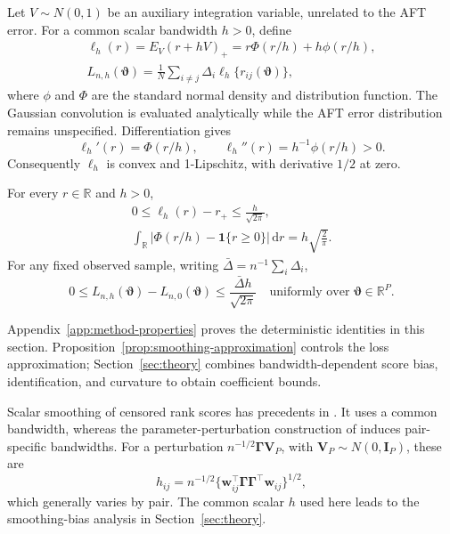 Let $V\sim N(0,1)$ be an auxiliary integration variable, unrelated to the AFT error. For a common scalar bandwidth $h>0$, define
\begin{equation}
 \begin{gathered}
\ell_h(r)=E_V(r+hV)_+
   =r\Phi(r/h)+h\phi(r/h),\\
 L_{n,h}(\bm{\vartheta})=\frac1N\sum_{i\ne j}\Delta_i\ell_h\{r_{ij}(\bm{\vartheta})\},
 \end{gathered}
 \label{eq:smoothed-gehan}
\end{equation}
where $\phi$ and $\Phi$ are the standard normal density and distribution function. The Gaussian convolution is evaluated analytically while the AFT error distribution remains unspecified. Differentiation gives
\begin{equation}
 \ell_h'(r)=\Phi(r/h),\qquad
 \ell_h''(r)=h^{-1}\phi(r/h)>0.
 \label{eq:scalar-derivatives}
\end{equation}
Consequently $\ell_h$ is convex and 1-Lipschitz, with derivative $1/2$ at zero.

\begin{proposition}
\label{prop:smoothing-approximation}
For every $r\in\mathbb R$ and $h>0$,
\begin{equation}
 \begin{gathered}
0\le \ell_h(r)-r_+\le\frac{h}{\sqrt{2\pi}},\\
 \int_{\mathbb R}|\Phi(r/h)-\mathbf 1\{r\ge0\}|\,\mathrm{d}r
   =h\sqrt{\frac2\pi}.
 \end{gathered}
 \label{eq:smoothing-bounds}
\end{equation}
For any fixed observed sample, writing $\bar\Delta=n^{-1}\sum_i\Delta_i$,
\begin{equation}
 0\le L_{n,h}(\bm{\vartheta})-L_{n,0}(\bm{\vartheta})
   \le \frac{\bar\Delta h}{\sqrt{2\pi}}
 \quad\text{uniformly over }\bm{\vartheta}\in\mathbb R^P.
 \label{eq:uniform-loss-bound}
\end{equation}
\end{proposition}
Appendix~\ref{app:method-properties} proves the deterministic identities in this section. Proposition~\ref{prop:smoothing-approximation} controls the loss approximation; Section~\ref{sec:theory} combines bandwidth-dependent score bias, identification, and curvature to obtain coefficient bounds.

Scalar smoothing of censored rank scores has precedents in \citet{Heller2007}. It uses a common bandwidth, whereas the parameter-perturbation construction of \citet{JohnsonStrawderman2009} induces pair-specific bandwidths. For a perturbation $n^{-1/2}\bm{\Gamma} \bm{V}_P$, with $\bm{V}_P\sim N(0,\bm{I}_P)$, these are
\[
 h_{ij}=n^{-1/2}\{\bm{w}_{ij}^\top\bm{\Gamma}\bm{\Gamma}^\top \bm{w}_{ij}\}^{1/2},
\]
which generally varies by pair. The common scalar $h$ used here leads to the smoothing-bias analysis in Section~\ref{sec:theory}.

